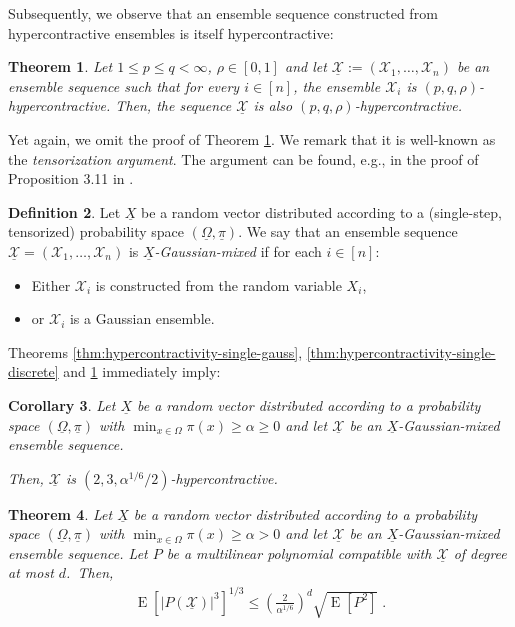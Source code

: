 \documentclass{daj}
\newcommand{\1}{\mathbbm{1}}
\theoremstyle{plain}
\newtheorem{theorem}{Theorem}[section]
\newtheorem{corollary}[theorem]{Corollary}
\theoremstyle{definition}
\newtheorem{definition}[theorem]{Definition}
\DeclareMathOperator*{\EE}{E}
\begin{document}
Subsequently, we observe that
an ensemble sequence constructed from
hypercontractive ensembles is itself hypercontractive:

\begin{theorem}
\label{thm:tensorization}
Let $1 \le p \le q < \infty$, $\rho \in [0, 1]$ and let
$\underline{\mathcal{X}} := (\mathcal{X}_1, \ldots, \mathcal{X}_n)$
be an ensemble sequence such that
for every $i \in [n]$, the ensemble $\mathcal{X}_i$
is $(p, q, \rho)$-hypercontractive. Then,
the sequence $\underline{\mathcal{X}}$ is also
$(p, q, \rho)$-hypercontractive.
\end{theorem}

Yet again, we omit the proof of Theorem \ref{thm:tensorization}.
We remark that it is well-known as the \emph{tensorization argument}.
The argument can be found, e.g., in the proof of Proposition 3.11
in \cite{MOO10}.

\begin{definition}
Let $\underline{X}$ be a random vector distributed
according to a (single-step, tensorized) probability space 
$(\underline{\Omega}, \underline{\pi})$.
We say that an ensemble sequence
$\underline{\mathcal{X}} = (\mathcal{X}_1, \ldots, \mathcal{X}_n)$
is \emph{$\underline{X}$-Gaussian-mixed} if
for each $i \in[n]$:
\begin{itemize}
\item Either $\mathcal{X}_i$ is constructed
from the random variable $X_i$,
\item or $\mathcal{X}_i$ is a Gaussian ensemble.
\end{itemize}
\end{definition}

Theorems \ref{thm:hypercontractivity-single-gauss},
\ref{thm:hypercontractivity-single-discrete} and
\ref{thm:tensorization} immediately imply:

\begin{corollary}
\label{cor:hypercontractivity}
Let $\underline{X}$ be a random vector distributed according to
a probability space
$(\underline{\Omega}, \underline{\pi})$ with
$\min_{x \in \Omega} \pi(x) \ge \alpha \ge 0$
and let $\underline{\mathcal{X}}$ be an 
$\underline{X}$-Gaussian-mixed
ensemble sequence.

Then, $\underline{\mathcal{X}}$ is $(2, 3, \alpha^{1/6}/2)$-hypercontractive.
\end{corollary}

\begin{theorem}
\label{thm:hypercontractivity-degree}
Let $\underline{X}$ be a random vector distributed according to a
probability space $(\underline{\Omega}, \underline{\pi})$
with $\min_{x \in \Omega} \pi(x) \ge \alpha > 0$
and let $\underline{\mathcal{X}}$ be an $\underline{X}$-Gaussian-mixed
ensemble sequence.
Let $P$ be a multilinear
polynomial compatible with $\underline{\mathcal{X}}$ of degree at most $d$.\
Then,
\begin{align*}
\EE\left[ \left| P(\underline{\mathcal{X}})  \right|^3  \right]^{1/3}
\le \left(\frac{2}{\alpha^{1/6}}\right)^d 
\sqrt{\EE\left[ P^2 \right]} \; .
\end{align*}
\end{theorem}
\end{document}
